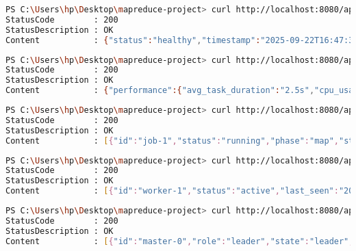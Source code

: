 \documentclass[12pt,a4paper]{article}
\begin{document}
\begin{lstlisting}[language=bash, caption=Test Endpoint Health]
PS C:\Users\hp\Desktop\mapreduce-project> curl http://localhost:8080/api/v1/health
StatusCode        : 200
StatusDescription : OK
Content           : {"status":"healthy","timestamp":"2025-09-22T16:47:34.903662+02:00","checks":{},"version":"1.0.0","uptime":9375670200}
\end{lstlisting}

\begin{lstlisting}[language=bash, caption=Test Endpoint Metrics]
PS C:\Users\hp\Desktop\mapreduce-project> curl http://localhost:8080/api/v1/metrics
StatusCode        : 200
StatusDescription : OK
Content           : {"performance":{"avg_task_duration":"2.5s","cpu_usage":"45%","memory_usage":"128MB","throughput":"10 tasks/min"},"raft_state":{"leader":true,"log_size":100,"term":1},"tasks_total":{"failed":0,"map_completed":15,"reduce_completed":8}}
\end{lstlisting}

\begin{lstlisting}[language=bash, caption=Test Endpoint Jobs]
PS C:\Users\hp\Desktop\mapreduce-project> curl http://localhost:8080/api/v1/jobs
StatusCode        : 200
StatusDescription : OK
Content           : [{"id":"job-1","status":"running","phase":"map","start_time":"2025-09-22T16:42:45.6295905+02:00","duration":0,"map_tasks":10,"reduce_tasks":5,"progress":75.5}]
\end{lstlisting}

\begin{lstlisting}[language=bash, caption=Test Endpoint Workers]
PS C:\Users\hp\Desktop\mapreduce-project> curl http://localhost:8080/api/v1/workers
StatusCode        : 200
StatusDescription : OK
Content           : [{"id":"worker-1","status":"active","last_seen":"2025-09-22T16:47:20.7197358+02:00","tasks_done":15},{"id":"worker-2","status":"active","last_seen":"2025-09-22T16:47:05.7197358+02:00","tasks_done":12}]
\end{lstlisting}

\begin{lstlisting}[language=bash, caption=Test Endpoint Masters]
PS C:\Users\hp\Desktop\mapreduce-project> curl http://localhost:8080/api/v1/masters
StatusCode        : 200
StatusDescription : OK
Content           : [{"id":"master-0","role":"leader","state":"leader","leader":true,"last_seen":"2025-09-22T16:47:45.603032+02:00"},{"id":"master-1","role":"follower","state":"follower","leader":false,"last_seen":"2025-09-22T16:47:30.603032+02:00"}]
\end{lstlisting}
\end{document}
